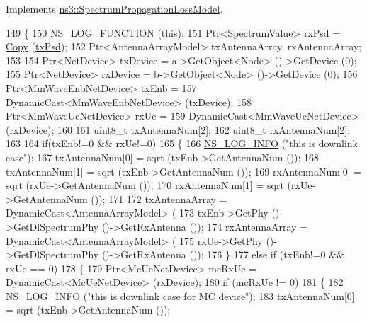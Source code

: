 Implements \hyperlink{classns3_1_1SpectrumPropagationLossModel_a84c0da581e8828ee013fe164a899e5c9}{ns3\+::\+Spectrum\+Propagation\+Loss\+Model}.


\begin{DoxyCode}
149 \{
150         \hyperlink{log-macros-disabled_8h_a90b90d5bad1f39cb1b64923ea94c0761}{NS\_LOG\_FUNCTION} (\textcolor{keyword}{this});
151         Ptr<SpectrumValue> rxPsd = \hyperlink{namespacens3_a952d99f6d759fee74dda19f308451bc1}{Copy} (\hyperlink{lte__link__budget_8m_a684fe3101a5e48a5fcc57cab8dbcd1aa}{txPsd});
152         Ptr<AntennaArrayModel> txAntennaArray, rxAntennaArray;
153 
154         Ptr<NetDevice> txDevice = a->GetObject<Node> ()->GetDevice (0);
155         Ptr<NetDevice> rxDevice = \hyperlink{buildings__pathloss_8m_a21ad0bd836b90d08f4cf640b4c298e7c}{b}->GetObject<Node> ()->GetDevice (0);
156         Ptr<MmWaveEnbNetDevice> txEnb =
157                                         DynamicCast<MmWaveEnbNetDevice> (txDevice);
158         Ptr<MmWaveUeNetDevice> rxUe =
159                                         DynamicCast<MmWaveUeNetDevice> (rxDevice);
160 
161         uint8\_t txAntennaNum[2];
162         uint8\_t rxAntennaNum[2];
163 
164         \textcolor{keywordflow}{if}(txEnb!=0 && rxUe!=0)
165         \{
166                 \hyperlink{group__logging_gafbd73ee2cf9f26b319f49086d8e860fb}{NS\_LOG\_INFO} (\textcolor{stringliteral}{"this is downlink case"});
167                 txAntennaNum[0] = sqrt (txEnb->GetAntennaNum ());
168                 txAntennaNum[1] = sqrt (txEnb->GetAntennaNum ());
169                 rxAntennaNum[0] = sqrt (rxUe->GetAntennaNum ());
170                 rxAntennaNum[1] = sqrt (rxUe->GetAntennaNum ());
171 
172                 txAntennaArray = DynamicCast<AntennaArrayModel> (
173                                         txEnb->GetPhy ()->GetDlSpectrumPhy ()->GetRxAntenna ());
174                 rxAntennaArray = DynamicCast<AntennaArrayModel> (
175                                         rxUe->GetPhy ()->GetDlSpectrumPhy ()->GetRxAntenna ());
176         \}
177         \textcolor{keywordflow}{else} \textcolor{keywordflow}{if} (txEnb!=0 && rxUe == 0)
178         \{
179                 Ptr<McUeNetDevice> mcRxUe = DynamicCast<McUeNetDevice> (rxDevice);
180                 \textcolor{keywordflow}{if} (mcRxUe != 0) 
181                 \{
182                         \hyperlink{group__logging_gafbd73ee2cf9f26b319f49086d8e860fb}{NS\_LOG\_INFO} (\textcolor{stringliteral}{"this is downlink case for MC device"});
183                         txAntennaNum[0] = sqrt (txEnb->GetAntennaNum ());

\end{DoxyCode}

